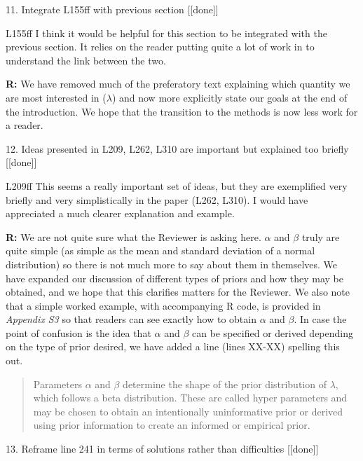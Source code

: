 \documentclass[12pt]{letter}
\newenvironment{refquote}{\bigskip \begin{it}}{\end{it}\smallskip}
\begin{document}
	11. Integrate L155ff with previous section [[done]]

		\begin{refquote}
		L155ff I think it would be helpful for this section to be integrated with the previous section. It relies on the reader putting quite a lot of work in to understand the link between the two.
		\end{refquote}

		\textbf{R:} We have removed much of the preferatory text explaining which quantity we are most interested in ($\lambda$) and now more explicitly state our goals at the end of the introduction. We hope that the transition to the methods is now less work for a reader.


	12. Ideas presented in L209, L262, L310 are important but explained too briefly [[done]]

		\begin{refquote}
		L209ff This seems a really important set of ideas, but they are exemplified very briefly and very simplistically in the paper (L262, L310). I would have appreciated a much clearer explanation and example.
		\end{refquote}

		\textbf{R:} We are not quite sure what the Reviewer is asking here. $\alpha$ and $\beta$ truly are quite simple (as simple as the mean and standard deviation of a normal distribution) so there is not much more to say about them in themselves. We have expanded our discussion of different types of priors and how they may be obtained, and we hope that this clarifies matters for the Reviewer. We also note that a simple worked example, with accompanying R code, is provided in \emph{Appendix S3} so that readers can see exactly how to obtain $\alpha$ and $\beta$. In case the point of confusion is the idea that $\alpha$ and $\beta$ can be specified or derived depending on the type of prior desired, we have added a line (lines XX-XX) spelling this out.

		\begin{quotation}
			Parameters $\alpha$ and $\beta$ determine the shape of the prior distribution of $\lambda$, which follows a beta distribution. These are called hyper parameters and may be chosen to obtain an intentionally uninformative prior or derived using prior information to create an informed or empirical prior. 
			\end{quotation}


	13. Reframe line 241 in terms of solutions rather than difficulties [[done]]
\end{document}
